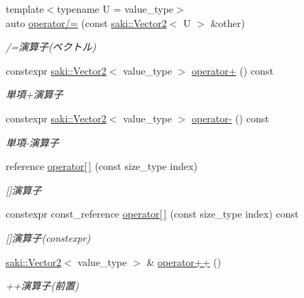 \begin{DoxyCompactItemize}
{\footnotesize template$<$typename U  = value\+\_\+type$>$ }\\auto \mbox{\hyperlink{classsaki_1_1_vector2_a108831d9de33c1f71dff2d96bf75b912}{operator/=}} (const \mbox{\hyperlink{classsaki_1_1_vector2}{saki\+::\+Vector2}}$<$ U $>$ \&other)
\begin{DoxyCompactList}\small\item\em /=演算子(ベクトル) \end{DoxyCompactList}\item 
constexpr \mbox{\hyperlink{classsaki_1_1_vector2}{saki\+::\+Vector2}}$<$ value\+\_\+type $>$ \mbox{\hyperlink{classsaki_1_1_vector2_ab1026aa5555d4b6e8e82331eeff32ec2}{operator+}} () const
\begin{DoxyCompactList}\small\item\em 単項+演算子 \end{DoxyCompactList}\item 
constexpr \mbox{\hyperlink{classsaki_1_1_vector2}{saki\+::\+Vector2}}$<$ value\+\_\+type $>$ \mbox{\hyperlink{classsaki_1_1_vector2_ad3b4cfcb39825f88e7176ebaaf580d7f}{operator-\/}} () const
\begin{DoxyCompactList}\small\item\em 単項-\/演算子 \end{DoxyCompactList}\item 
reference \mbox{\hyperlink{classsaki_1_1_vector2_a3578649a1c5b97df8bfb0b1932c24b8a}{operator\mbox{[}$\,$\mbox{]}}} (const size\+\_\+type index)
\begin{DoxyCompactList}\small\item\em \mbox{[}\mbox{]}演算子 \end{DoxyCompactList}\item 
constexpr const\+\_\+reference \mbox{\hyperlink{classsaki_1_1_vector2_a8b2729917f50b5ba02005e3cccc60856}{operator\mbox{[}$\,$\mbox{]}}} (const size\+\_\+type index) const
\begin{DoxyCompactList}\small\item\em \mbox{[}\mbox{]}演算子(constexpr) \end{DoxyCompactList}\item 
\mbox{\hyperlink{classsaki_1_1_vector2}{saki\+::\+Vector2}}$<$ value\+\_\+type $>$ \& \mbox{\hyperlink{classsaki_1_1_vector2_a7eb1b73a53daafb5da4440b63f9b99d1}{operator++}} ()
\begin{DoxyCompactList}\small\item\em ++演算子(前置) \end{DoxyCompactList}\item 

\end{DoxyCompactItemize}
